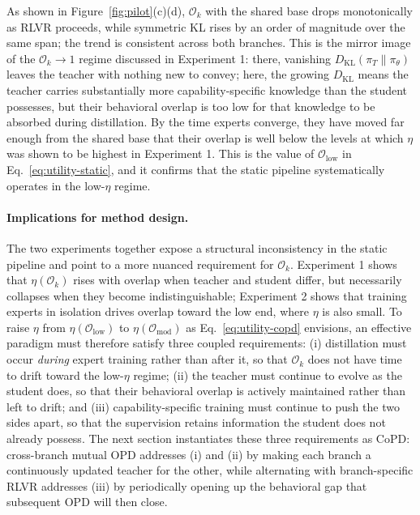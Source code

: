 As shown in Figure~\ref{fig:pilot}(c)(d), $\mathcal{O}_k$ with the shared base drops monotonically as RLVR proceeds, while symmetric KL rises by an order of magnitude over the same span; the trend is consistent across both branches. This is the mirror image of the $\mathcal{O}_k \to 1$ regime discussed in Experiment 1: there, vanishing $D_{\mathrm{KL}}(\pi_T \| \pi_\theta)$ leaves the teacher with nothing new to convey; here, the growing $D_{\mathrm{KL}}$ means the teacher carries substantially more capability-specific knowledge than the student possesses, but their behavioral overlap is too low for that knowledge to be absorbed during distillation. By the time experts converge, they have moved far enough from the shared base that their overlap is well below the levels at which $\eta$ was shown to be highest in Experiment 1. This is the value of $\mathcal{O}_{\text{low}}$ in Eq.~\eqref{eq:utility-static}, and it confirms that the static pipeline systematically operates in the low-$\eta$ regime.


\paragraph{Implications for method design.}
The two experiments together expose a structural inconsistency in the static pipeline and point to a more nuanced requirement for $\mathcal{O}_k$. Experiment 1 shows that $\eta(\mathcal{O}_k)$ rises with overlap when teacher and student differ, but necessarily collapses when they become indistinguishable; Experiment 2 shows that training experts in isolation drives overlap toward the low end, where $\eta$ is also small. To raise $\eta$ from $\eta(\mathcal{O}_{\text{low}})$ to $\eta(\mathcal{O}_{\text{mod}})$ as Eq.~\eqref{eq:utility-copd} envisions, an effective paradigm must therefore satisfy three coupled requirements: (i) distillation must occur \emph{during} expert training rather than after it, so that $\mathcal{O}_k$ does not have time to drift toward the low-$\eta$ regime; (ii) the teacher must continue to evolve as the student does, so that their behavioral overlap is actively maintained rather than left to drift; and (iii) capability-specific training must continue to push the two sides apart, so that the supervision retains information the student does not already possess. The next section instantiates these three requirements as CoPD: cross-branch mutual OPD addresses (i) and (ii) by making each branch a continuously updated teacher for the other, while alternating with branch-specific RLVR addresses (iii) by periodically opening up the behavioral gap that subsequent OPD will then close.